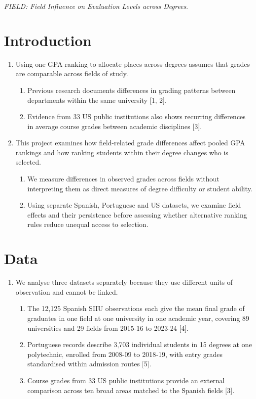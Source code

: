 \documentclass[clean]{bam-outline}
\begin{document}
\makeproposalheader

\noindent\textit{FIELD: Field Influence on Evaluation Levels across Degrees.}

\section{Introduction}
\begin{enumerate}
\item Using one GPA ranking to allocate places across degrees assumes that grades are comparable across fields of study.
  \begin{enumerate}
  \item Previous research documents differences in grading patterns between departments within the same university [1, 2].
  \item Evidence from 33 US public institutions also shows recurring differences in average course grades between academic disciplines [3].
  \end{enumerate}
\item This project examines how field-related grade differences affect pooled GPA rankings and how ranking students within their degree changes who is selected.
  \begin{enumerate}
  \item We measure differences in observed grades across fields without interpreting them as direct measures of degree difficulty or student ability.
  \item Using separate Spanish, Portuguese and US datasets, we examine field effects and their persistence before assessing whether alternative ranking rules reduce unequal access to selection.
  \end{enumerate}
\end{enumerate}

\section{Data}
\begin{enumerate}[resume]
\item We analyse three datasets separately because they use different units of observation and cannot be linked.
  \begin{enumerate}
  \item The 12,125 Spanish SIIU observations each give the mean final grade of graduates in one field at one university in one academic year, covering 89 universities and 29 fields from 2015-16 to 2023-24 [4].
  \item Portuguese records describe 3,703 individual students in 15 degrees at one polytechnic, enrolled from 2008-09 to 2018-19, with entry grades standardised within admission routes [5].
  \item Course grades from 33 US public institutions provide an external comparison across ten broad areas matched to the Spanish fields [3].
  \end{enumerate}
\end{enumerate}
\end{document}
